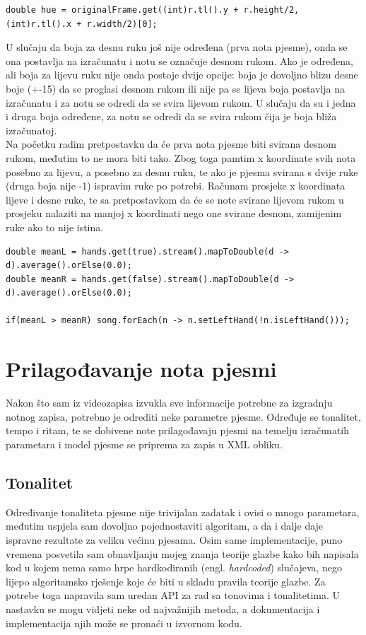 \documentclass[times, utf8, zavrsni, numeric]{fer}
\begin{document}
\begin{lstlisting}
double hue = originalFrame.get((int)r.tl().y + r.height/2, (int)r.tl().x + r.width/2)[0];
\end{lstlisting}

U slučaju da boja za desnu ruku još nije određena (prva nota pjesme), onda se ona postavlja na izračunatu i notu se označuje desnom rukom. Ako je određena, ali boja za lijevu ruku nije onda postoje dvije opcije: boja je dovoljno blizu desne boje (+-15) da se proglasi desnom rukom ili nije pa se lijeva boja postavlja na izračunatu i za notu se odredi da se svira lijevom rukom. U slučaju da su i jedna i druga boja određene, za notu se odredi da se svira rukom čija je boja bliža izračunatoj.\\

Na početku radim pretpostavku da će prva nota pjesme biti svirana desnom rukom, međutim to ne mora biti tako. Zbog toga pamtim x koordinate svih nota posebno za lijevu, a posebno za desnu ruku, te ako je pjesma svirana s dvije ruke (druga boja nije -1) ispravim ruke po potrebi. Računam prosjeke x koordinata lijeve i desne ruke, te sa pretpostavkom da će se note svirane lijevom rukom u prosjeku nalaziti na manjoj x koordinati nego one svirane desnom, zamijenim ruke ako to nije istina.

\begin{lstlisting}
double meanL = hands.get(true).stream().mapToDouble(d -> d).average().orElse(0.0);
double meanR = hands.get(false).stream().mapToDouble(d -> d).average().orElse(0.0);

if(meanL > meanR) song.forEach(n -> n.setLeftHand(!n.isLeftHand()));
\end{lstlisting}

\section{Prilagođavanje nota pjesmi}
Nakon što sam iz videozapisa izvukla sve informacije potrebne za izgradnju notnog zapisa, potrebno je odrediti neke parametre pjesme. Određuje se tonalitet, tempo i ritam, te se dobivene note prilagođavaju pjesmi na temelju izračunatih parametara i model pjesme se priprema za zapis u XML obliku.

\subsection{Tonalitet}
Određivanje tonaliteta pjesme nije trivijalan zadatak i ovisi o mnogo parametara, međutim uspjela sam dovoljno pojednostaviti algoritam, a da i dalje daje ispravne rezultate za veliku većinu pjesama. Osim same implementacije, puno vremena posvetila sam obnavljanju mojeg znanja teorije glazbe kako bih napisala kod u kojem nema samo hrpe hardkodiranih (engl. \textit{hardcoded}) slučajeva, nego lijepo algoritamsko rješenje koje će biti u skladu pravila teorije glazbe. Za potrebe toga napravila sam uredan API za rad sa tonovima i tonalitetima. U nastavku se mogu vidjeti neke od najvažnijih metoda, a dokumentacija i implementacija njih može se pronaći u izvornom kodu. 
\end{document}
